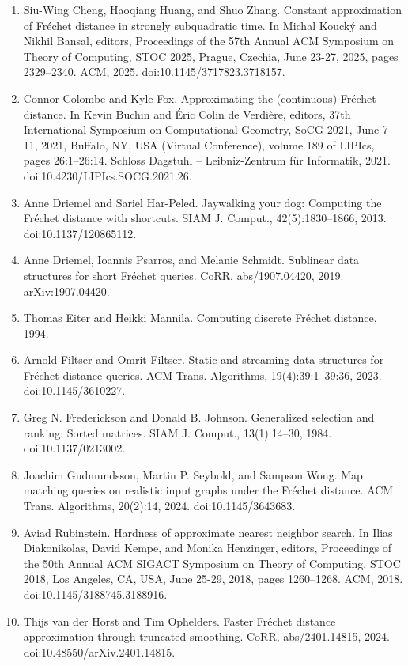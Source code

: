\documentclass[10pt,a4paper]{article}
\begin{document}
\begin{enumerate}
\item[]  [17]  Siu-Wing Cheng, Haoqiang Huang, and Shuo Zhang.  Constant approximation of Fréchet distance in strongly subquadratic time.  In Michal Koucký and Nikhil Bansal, editors, Proceedings of the 57th Annual ACM Symposium on Theory of Computing, STOC 2025, Prague, Czechia, June 23-27, 2025, pages 2329–2340. ACM, 2025.  doi:10.1145/3717823.3718157.  
\item[]  [18]  Connor Colombe and Kyle Fox.  Approximating the (continuous) Fréchet distance.  In Kevin Buchin and Éric Colin de Verdière, editors, 37th International Symposium on Computational Geometry, SoCG 2021, June 7-11, 2021, Buffalo, NY, USA (Virtual Conference), volume 189 of LIPIcs, pages 26:1–26:14. Schloss Dagstuhl – Leibniz-Zentrum für Informatik, 2021.  doi:10.4230/LIPIcs.SOCG.2021.26.  
\item[]  [19]  Anne Driemel and Sariel Har-Peled.  Jaywalking your dog: Computing the Fréchet distance with shortcuts.  SIAM J. Comput., 42(5):1830–1866, 2013.  doi:10.1137/120865112.  
\item[]  [20]  Anne Driemel, Ioannis Psarros, and Melanie Schmidt.  Sublinear data structures for short Fréchet queries.  CoRR, abs/1907.04420, 2019.  arXiv:1907.04420.  
\item[]  [21]  Thomas Eiter and Heikki Mannila.  Computing discrete Fréchet distance, 1994.  
\item[]  [22]  Arnold Filtser and Omrit Filtser.  Static and streaming data structures for Fréchet distance queries.  ACM Trans. Algorithms, 19(4):39:1–39:36, 2023.  doi:10.1145/3610227.  
\item[]  [23]  Greg N. Frederickson and Donald B. Johnson.  Generalized selection and ranking: Sorted matrices.  SIAM J. Comput., 13(1):14–30, 1984.  doi:10.1137/0213002.  
\item[]  [24]  Joachim Gudmundsson, Martin P. Seybold, and Sampson Wong.  Map matching queries on realistic input graphs under the Fréchet distance.  ACM Trans. Algorithms, 20(2):14, 2024.  doi:10.1145/3643683.  
\item[]  [25]  Aviad Rubinstein.  Hardness of approximate nearest neighbor search.  In Ilias Diakonikolas, David Kempe, and Monika Henzinger, editors, Proceedings of the 50th Annual ACM SIGACT Symposium on Theory of Computing, STOC 2018, Los Angeles, CA, USA, June 25-29, 2018, pages 1260–1268. ACM, 2018.  doi:10.1145/3188745.3188916.  
\item[]  [26]  Thijs van der Horst and Tim Ophelders.  Faster Fréchet distance approximation through truncated smoothing.  CoRR, abs/2401.14815, 2024.  doi:10.48550/arXiv.2401.14815.  

\end{enumerate}
\end{document}
